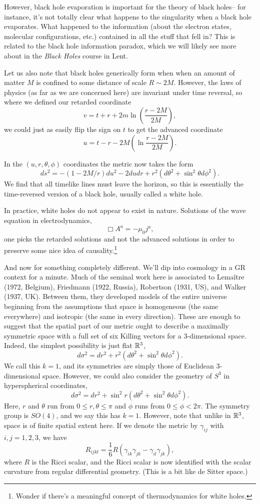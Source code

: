 However, black hole evaporation is important for the theory of black holes-- for instance, it's not totally clear what happens to the singularity when a black hole evaporates. What happened to the information (about the electron states, molecular configurations, etc.) contained in all the stuff that fell in? This is related to the black hole information paradox, which we will likely see more about in the \emph{Black Holes} course in Lent.

Let us also note that black holes generically form when when an amount of matter $M$ is confined to some distance of scale $R\sim 2M$. However, the laws of physics (as far as we are concerned here) are invariant under time reversal, so where we defined our retarded coordinate
$$v=t+r+2m\ln (\frac{r-2M}{2M}),$$
we could just as easily flip the sign on $t$ to get the advanced coordinate
$$u=t-r-2M(\ln \frac{r-2M}{2M}).$$

In the $(u,r,\theta,\phi)$ coordinates the metric now takes the form 
$$ds^2=-(1-2M/r)du^2-2dudr +r^2(d\theta^2 +\sin^2\theta d\phi^2).$$
We find that all timelike lines must leave the horizon, so this is essentially the time-reversed version of a black hole, usually called a white hole.

In practice, white holes do not appear to exist in nature. Solutions of the wave equation in electrodynamics,
$$\Box A^a=-\mu_0 j^a,$$
one picks the retarded solutions and not the advanced solutions in order to preserve some nice idea of causality.\footnote{Wonder if there's a meaningful concept of thermodynamics for white holes.}

And now for something completely different. We'll dip into cosmology in a GR context for a minute. Much of the seminal work here is associated to Lema\^itre (1972, Belgium), Friedmann (1922, Russia), Robertson (1931, US), and Walker (1937, UK). Between them, they developed models of the entire universe beginning from the assumptions that space is homogeneous (the same everywhere) and isotropic (the same in every direction). These are enough to suggest that the spatial part of our metric ought to describe a maximally symmetric space with a full set of six Killing vectors for a 3-dimensional space. Indeed, the simplest possibility is just flat $\mathbb{R}^3$,
$$d\sigma^2=dr^2+r^2(d\theta^2+\sin^2\theta d\phi^2).$$
We call this $k=1$, and its symmetries are simply those of Euclidean 3-dimensional space. However, we could also consider the geometry of $S^3$ in hyperspherical coordinates,
$$d\sigma^2=dr^2+\sin^2 r(d\theta^2+\sin^2\theta d\phi^2).$$ Here, $r$ and $\theta$ run from $0\leq r,\theta\leq \pi$ and $\phi$ runs from $0\leq \phi < 2\pi$. The symmetry group is $SO(4)$, and we say this has $k=1$. However, note that unlike in $\mathbb{R}^3$, space is of finite spatial extent here. If we denote the metric by $\gamma_{ij}$ with $i,j=1,2,3$, we have
$$R_{ijkl}=\frac{1}{6}R(\gamma_{ik}\gamma_{jk}-\gamma_{il}\gamma_{jk}),$$
where $R$ is the Ricci scalar, and the Ricci scalar is now identified with the scalar curvature from regular differential geometry. (This is a bit like de Sitter space.)

